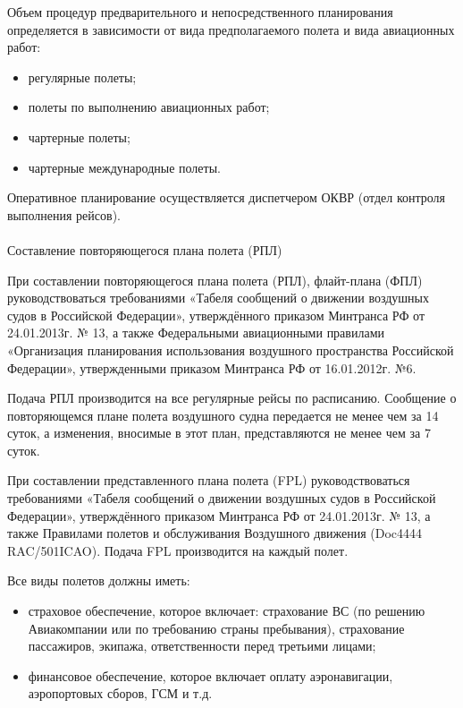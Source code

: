 Объем процедур предварительного и непосредственного планирования определяется в зависимости от вида предполагаемого полета и вида авиационных работ:

\begin{itemize}
    \item регулярные полеты;
    \item полеты по выполнению авиационных работ;
    \item чартерные полеты;
    \item чартерные международные полеты.    
\end{itemize}

Оперативное планирование осуществляется диспетчером ОКВР (отдел контроля выполнения рейсов).

\paragraph{} Составление повторяющегося плана полета (РПЛ)

При составлении повторяющегося плана полета (РПЛ), флайт-плана (ФПЛ) руководствоваться требованиями «Табеля сообщений о движении воздушных судов в Российской Федерации», утверждённого приказом Минтранса РФ от 24.01.2013г. № 13, а также Федеральными авиационными правилами «Организация планирования использования воздушного пространства Российской Федерации», утвержденными приказом Минтранса РФ от 16.01.2012г. №6.

Подача РПЛ производится на все регулярные рейсы по расписанию. Сообщение о повторяющемся плане полета воздушного судна передается не менее чем за 14 суток, а изменения, вносимые в этот план, представляются не менее чем за 7 суток.

При составлении представленного плана полета (FPL) руководствоваться требованиями «Табеля сообщений о движении воздушных судов в Российской Федерации», утверждённого приказом Минтранса РФ от 24.01.2013г. № 13, а также Правилами полетов и обслуживания Воздушного движения (Doc4444 RAC/501ICAO). Подача FPL производится на каждый полет.

Все виды полетов должны иметь:

\begin{itemize}
    \item страховое обеспечение, которое включает: страхование ВС (по решению Авиакомпании или по требованию страны пребывания), страхование пассажиров, экипажа, ответственности перед третьими лицами;
    \item финансовое обеспечение, которое включает оплату аэронавигации, аэропортовых сборов, ГСМ и т.д.
\end{itemize}

